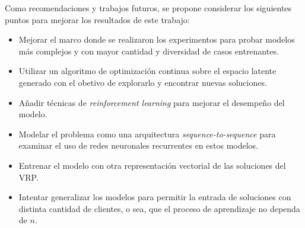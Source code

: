 Como recomendaciones y trabajos futuros, se propone considerar los siguientes puntos para mejorar los resultados de este trabajo:
\begin{itemize}
	\item Mejorar el marco donde se realizaron los experimentos para probar modelos más complejos y con mayor cantidad y diversidad de casos entrenantes.
	
	\item Utilizar un algoritmo de optimización continua sobre el espacio latente generado con el obetivo de explorarlo y encontrar nuevas soluciones.
	
	\item Añadir técnicas de \textit{reinforcement learning} para mejorar el desempeño del modelo. 
	
	\item Modelar el problema como una arquitectura \textit{sequence-to-sequence} para examinar el uso de redes neuronales recurrentes en estos modelos.
	
	\item Entrenar el modelo con otra representación vectorial de las soluciones del VRP.
	
	
	\item Intentar generalizar los modelos para permitir la entrada de soluciones con distinta cantidad de clientes, o sea, que el proceso de aprendizaje no dependa de $n$.
\end{itemize}



